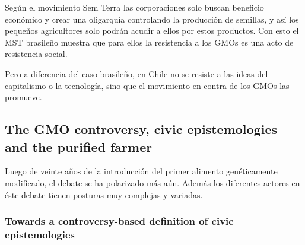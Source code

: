 \documentclass[11pt]{article}
\begin{document}
Según el movimiento Sem Terra las corporaciones solo buscan beneficio económico y crear una oligarquía controlando la producción de semillas, y así los pequeños agricultores solo podrán acudir a ellos por estos productos. Con esto el MST brasileño muestra que para ellos la resistencia a los GMOs es una acto de resistencia social.

Pero a diferencia del caso brasileño, en Chile no se resiste a las ideas del capitalismo o la tecnología, sino que el movimiento en contra de los GMOs las promueve.

\subsection{The GMO controversy, civic epistemologies and the purified farmer}
\label{sec:orgheadline4}

Luego de veinte años de la introducción del primer alimento genéticamente modificado, el debate se ha polarizado más aún. Además los diferentes actores en éste debate tienen posturas muy complejas y variadas.

\subsubsection{Towards a controversy-based definition of civic epistemologies}
\label{sec:orgheadline3}










\end{document}
